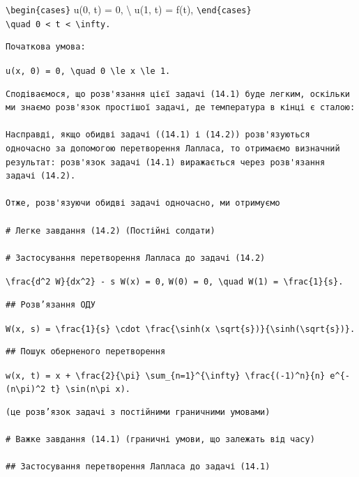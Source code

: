 \documentclass[
  ukrainian,
]{article}
\begin{document}
\texttt{\textbackslash{}begin\{cases\}} u(0, t) = 0, \textbackslash{}
u(1, t) = f(t), \texttt{\textbackslash{}end\{cases\}}
\texttt{\textbackslash{}quad\ 0\ \textless{}\ t\ \textless{}\ \textbackslash{}infty.}

\begin{verbatim}
Початкова умова:
\end{verbatim}

\texttt{u(x,\ 0)\ =\ 0,\ \textbackslash{}quad\ 0\ \textbackslash{}le\ x\ \textbackslash{}le\ 1.}

\begin{verbatim}
Сподіваємося, що розв'язання цієї задачі (14.1) буде легким, оскільки ми знаємо розв'язок простішої задачі, де температура в кінці є сталою:

Насправді, якщо обидві задачі ((14.1) і (14.2)) розв'язуються одночасно за допомогою перетворення Лапласа, то отримаємо визначний результат: розв'язок задачі (14.1) виражається через розв'язання задачі (14.2).

Отже, розв'язуючи обидві задачі одночасно, ми отримуємо

# Легке завдання (14.2) (Постійні солдати)

# Застосування перетворення Лапласа до задачі (14.2)
\end{verbatim}

\texttt{\textbackslash{}frac\{d\^{}2\ W\}\{dx\^{}2\}\ -\ s\ W(x)\ =\ 0,}
\texttt{W(0)\ =\ 0,\ \textbackslash{}quad\ W(1)\ =\ \textbackslash{}frac\{1\}\{s\}.}

\begin{verbatim}
## Розв’язання ОДУ
\end{verbatim}

\texttt{W(x,\ s)\ =\ \textbackslash{}frac\{1\}\{s\}\ \textbackslash{}cdot\ \textbackslash{}frac\{\textbackslash{}sinh(x\ \textbackslash{}sqrt\{s\})\}\{\textbackslash{}sinh(\textbackslash{}sqrt\{s\})\}.}

\begin{verbatim}
## Пошук оберненого перетворення
\end{verbatim}

\texttt{w(x,\ t)\ =\ x\ +\ \textbackslash{}frac\{2\}\{\textbackslash{}pi\}\ \textbackslash{}sum\_\{n=1\}\^{}\{\textbackslash{}infty\}\ \textbackslash{}frac\{(-1)\^{}n\}\{n\}\ e\^{}\{-(n\textbackslash{}pi)\^{}2\ t\}\ \textbackslash{}sin(n\textbackslash{}pi\ x).}

\begin{verbatim}
(це розв’язок задачі з постійними граничними умовами)

# Важке завдання (14.1) (граничні умови, що залежать від часу)

## Застосування перетворення Лапласа до задачі (14.1)
\end{verbatim}
\end{document}
